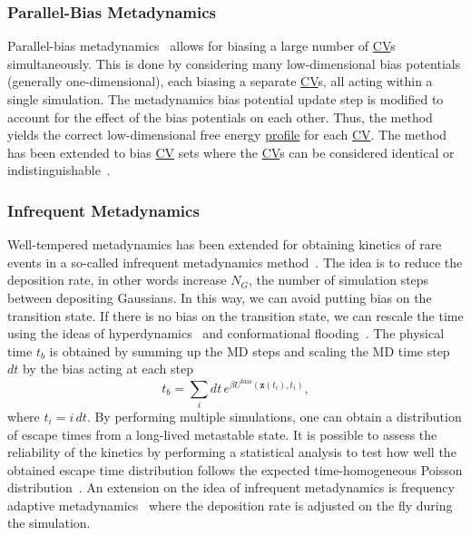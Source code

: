 \documentclass[9pt,review]{livecoms}
\newcommand{\vz}{\mathbf{z}}
\begin{document}
\subsubsection{Parallel-Bias Metadynamics}
\label{sec:pb-metad}
Parallel-bias metadynamics~\cite{Pfaendtner2015_pbmetad} allows for biasing a large number of \hyperlink{ref:CV} {CV}s simultaneously. This is done by considering many low-dimensional bias potentials (generally one-dimensional), each biasing a separate \hyperlink{ref:CV} {CV}s, all acting within a single simulation.  The metadynamics bias potential update step is modified to account for the effect of the bias potentials on each other. Thus, the method yields the correct low-dimensional free energy \hyperlink{ref:FES} {profile} for each \hyperlink{ref:CV} {CV}. The method has been extended to bias \hyperlink{ref:CV} {CV} sets where the \hyperlink{ref:CV} {CV}s can be considered identical or indistinguishable~\cite{Prakash2018_pbmetad-families}.


\subsubsection{Infrequent Metadynamics}
Well-tempered metadynamics has been extended for obtaining kinetics of rare events in a so-called infrequent metadynamics method~\cite{Tiwary-PRL-2013}. The idea is to reduce the deposition rate, in other words increase $N_{G}$, the number of simulation steps between depositing Gaussians. In this way, we can avoid putting bias on the transition state. If there is no bias on the transition state, we can rescale the time using the ideas of hyperdynamics~\cite{Voter-PRL-1997} and conformational flooding~\cite{Grubmuller-PRE-1995}. The physical time $t_b$ is obtained by summing up the MD steps and scaling the MD time step $dt$ by the bias acting at each step
\begin{equation}
\label{wtmetad_hyperdynamics}
t_b = \sum_{i} dt \, e^{\beta U^{\mathrm{bias}}(\vz(t_{i}),t_{i})},
\end{equation}
where $t_{i} = i\, dt$. By performing multiple simulations, one can obtain a distribution of escape times from a long-lived metastable state. It is possible to assess the reliability of the kinetics by performing a statistical analysis to test how well the obtained escape time distribution follows the expected time-homogeneous Poisson distribution~\cite{KS_Test_JCTC_2014}. An extension on the idea of infrequent metadynamics is frequency adaptive metadynamics~\cite{Wang2018_FA-MetaD} where the deposition rate is adjusted on the fly during the simulation.
\end{document}
